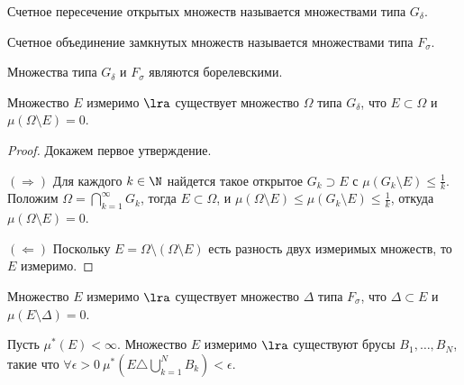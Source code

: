 
\begin{definition}
    Счетное пересечение открытых множеств называется множествами типа $G_{\delta}$.

    Счетное объединение замкнутых множеств называется множествами типа $F_{\sigma}$.
\end{definition}

\begin{note}
    Множества типа $G_{\delta}$ и $F_{\sigma}$ являются борелевскими.
\end{note}

\begin{theorem}
    Множество $E$ измеримо $\lra$ существует множество $\Omega$ типа $G_{\delta}$, что $E \subset \Omega$ и $\mu(\Omega \setminus E) = 0$.
\end{theorem}

\begin{proof}
    Докажем первое утверждение.

    $(\Rightarrow)$ Для каждого $k \in \N$ найдется такое открытое $G_{k} \supset E$ с $\mu(G_{k} \setminus E) \leq \frac{1}{k}$. Положим $\Omega = \bigcap_{k=1}^{\infty}G_{k}$, тогда $E \subset \Omega$, и $\mu(\Omega \setminus E) \leq \mu(G_{k} \setminus E) \leq \frac{1}{k}$, откуда $\mu(\Omega \setminus E) = 0$.

    $(\Leftarrow)$ Поскольку $E = \Omega \setminus (\Omega \setminus E)$ есть разность двух измеримых множеств, то $E$ измеримо.
\end{proof}

\begin{note}
    Множество $E$ измеримо $\lra$ существует множество $\Delta$ типа $F_{\sigma}$, что $\Delta \subset E$ и $\mu(E \setminus \Delta) = 0$.
\end{note}

\begin{theorem}
    Пусть $\mu^{*}(E) < \infty$. Множество $E$ измеримо $\lra$ существуют брусы $B_{1}, \ldots, B_{N}$, такие что $\forall \epsilon > 0 \ \mu^{*}(E \triangle \bigcup_{k = 1}^{N} B_{k}) < \epsilon$.
\end{theorem}

